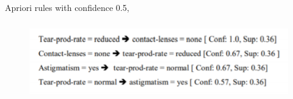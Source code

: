 \documentclass[12pt]{article}
\renewcommand{\_}{\kern-1.5pt\textunderscore\kern-1.5pt}
\begin{document}
\begin{adjustwidth}{0.03in}{0.0in}
Apriori rules with confidence 0.5, \par

\end{adjustwidth}




\begin{figure}[H]
	\begin{Center}
		\includegraphics[width=5.24in,height=1.34in]{./media/image33.png}
	\end{Center}
\end{figure}



\par


\vspace{\baselineskip}

\vspace{\baselineskip}

\vspace{\baselineskip}

\vspace{\baselineskip}

\vspace{\baselineskip}

\vspace{\baselineskip}

\vspace{\baselineskip}

\vspace{\baselineskip}

\vspace{\baselineskip}

\vspace{\baselineskip}

\vspace{\baselineskip}

\vspace{\baselineskip}
\end{document}
